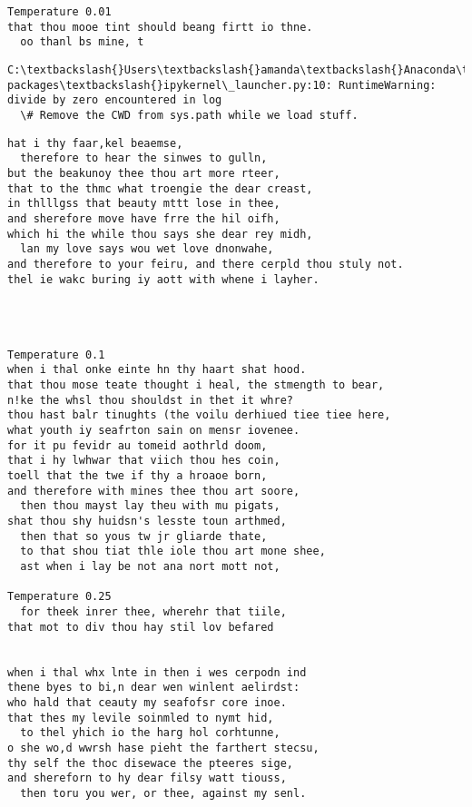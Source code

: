 \documentclass[11pt]{article}
\begin{document}
    \begin{Verbatim}[commandchars=\\\{\}]
Temperature 0.01
that thou mooe tint should beang firtt io thne.
  oo thanl bs mine, t
    \end{Verbatim}

    \begin{Verbatim}[commandchars=\\\{\}]
C:\textbackslash{}Users\textbackslash{}amanda\textbackslash{}Anaconda\textbackslash{}lib\textbackslash{}site-packages\textbackslash{}ipykernel\_launcher.py:10: RuntimeWarning: divide by zero encountered in log
  \# Remove the CWD from sys.path while we load stuff.

    \end{Verbatim}

    \begin{Verbatim}[commandchars=\\\{\}]
hat i thy faar,kel beaemse,
  therefore to hear the sinwes to gulln,
but the beakunoy thee thou art more rteer,
that to the thmc what troengie the dear creast,
in thlllgss that beauty mttt lose in thee,
and sherefore move have frre the hil oifh,
which hi the while thou says she dear rey midh,
  lan my love says wou wet love dnonwahe,
and therefore to your feiru, and there cerpld thou stuly not.
thel ie wakc buring iy aott with whene i layher.


                   

Temperature 0.1
when i thal onke einte hn thy haart shat hood.
that thou mose teate thought i heal, the stmength to bear,
n!ke the whsl thou shouldst in thet it whre?
thou hast balr tinughts (the voilu derhiued tiee tiee here,
what youth iy seafrton sain on mensr iovenee.
for it pu fevidr au tomeid aothrld doom,
that i hy lwhwar that viich thou hes coin,
toell that the twe if thy a hroaoe born,
and therefore with mines thee thou art soore,
  then thou mayst lay theu with mu pigats,
shat thou shy huidsn's lesste toun arthmed,
  then that so yous tw jr gliarde thate,
  to that shou tiat thle iole thou art mone shee,
  ast when i lay be not ana nort mott not,

Temperature 0.25
  for theek inrer thee, wherehr that tiile,
that mot to div thou hay stil lov befared

                    
when i thal whx lnte in then i wes cerpodn ind
thene byes to bi,n dear wen winlent aelirdst:
who hald that ceauty my seafofsr core inoe.
that thes my levile soinmled to nymt hid,
  to thel yhich io the harg hol corhtunne,
o she wo,d wwrsh hase pieht the farthert stecsu,
thy self the thoc disewace the pteeres sige,
and shereforn to hy dear filsy watt tiouss,
  then toru you wer, or thee, against my senl.
 


\end{Verbatim}
\end{document}
